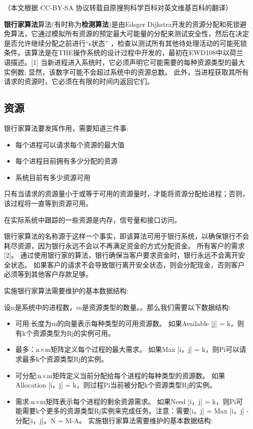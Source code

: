 
（本文根据 CC-BY-SA 协议转载自原搜狗科学百科对英文维基百科的翻译）

\textbf{银行家算法}算法(有时称为\textbf{检测算法})是由Edsger Dijkstra开发的资源分配和死锁避免算法，它通过模拟所有资源的预定最大可能量的分配来测试安全性，然后在决定是否允许继续分配之前进行“s状态” ，检查以测试所有其他待处理活动的可能死锁条件。该算法是在THE操作系统的设计过程中开发的，最初在EWD108中以荷兰语描述。[1] 当新进程进入系统时，它必须声明它可能需要的每种资源类型的最大实例数; 显然，该数字可能不会超过系统中的资源总数。 此外，当进程获取其所有请求的资源时，它必须在有限的时间内返回它们。

\subsection{资源}
银行家算法要发挥作用，需要知道三件事:
\begin{itemize}
\item 每个进程可以请求每个资源的最大值
\item 每个进程目前拥有多少分配的资源
\item 系统目前有多少资源可用
\end{itemize}
只有当请求的资源量小于或等于可用的资源量时，才能将资源分配给进程；否则，该过程将一直等到资源可用。

在实际系统中跟踪的一些资源是内存，信号量和接口访问。

银行家算法的名称源于这样一个事实，即该算法可用于银行系统，以确保银行不会耗尽资源，因为银行永远不会以不再满足资金的方式分配资金。 所有客户的需求[2]。 通过使用银行家的算法，银行确保当客户要求资金时，银行永远不会离开安全状态。 如果客户的请求不会导致银行离开安全状态，则会分配现金，否则客户必须等到其他客户存款足够。

实施银行家算法需要维护的基本数据结构:

设$n$是系统中的进程数，$m$是资源类型的数量。。那么我们需要以下数据结构:
\begin{itemize}
\item 可用:长度为m的向量表示每种类型的可用资源数。 如果Available [j] = k，则有k个资源类型为Rj的实例可用。
\item 最多：n×m矩阵定义每个过程的最大需求。 如果Max [i，j] = k，则Pi可以请求最多k个资源类型Rj的实例。
\item 可分配:n×m矩阵定义当前分配给每个进程的每种类型的资源数。 如果Allocation [i，j] = k，则过程Pi当前被分配k个资源类型Rj的实例。
\item 需求:n×m矩阵表示每个进程的剩余资源需求。 如果Need [i，j] = k，则Pi可能需要k个更多的资源类型Rj实例来完成任务。注意：需要[i，j] = Max [i，j] - 分配[i，j]。N = M-A。 实施银行家算法需要维护的基本数据结构:
\end{itemize}

